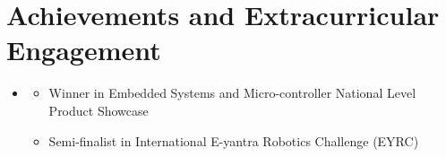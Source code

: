\documentclass[letterpaper,10pt]{article}
\newcommand{\resumeItem}[1]{
  \item{\small\setlength{\baselineskip}{10pt} #1 \vspace{-2pt}}
}
\newcommand{\resumeSubHeadingListStart}{\begin{itemize}[leftmargin=0in, label={}, topsep=0pt, partopsep=0pt]}
\newcommand{\resumeSubHeadingListEnd}{\end{itemize}}
\newcommand{\resumeItemListStart}{\begin{itemize}[leftmargin=0.15in, label={$\bullet$}, topsep=0pt, partopsep=0pt, itemsep=3pt, parsep=0pt]}
\newcommand{\resumeItemListEnd}{\end{itemize}}
\begin{document}
\section{Achievements and Extracurricular Engagement}
\resumeSubHeadingListStart
  \item \resumeItemListStart
    \resumeItem{Winner in Embedded Systems and Micro-controller National Level Product Showcase}
    \resumeItem{Semi-finalist in International E-yantra Robotics Challenge (EYRC)}
  \resumeItemListEnd
\resumeSubHeadingListEnd
\end{document}
